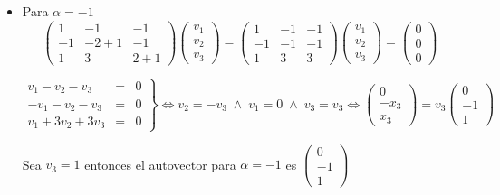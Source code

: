 \begin{enumerate}
\begin{itemize}
	\item Para $\alpha=-1$
	    $$
	    \begin{pmatrix}
		1 & -1 & -1 \\
		-1 & -2+1 & -1 \\
		1 & 3 & 2+1
	    \end{pmatrix}  
	    \begin{pmatrix}
		v_1 \\
		v_2 \\
		v_3
	    \end{pmatrix} = 
	    \begin{pmatrix}
		1 & -1 & -1 \\
		-1 & -1 & -1 \\
		1 & 3 & 3 
	    \end{pmatrix}  
	    \begin{pmatrix}
		v_1 \\
		v_2 \\
		v_3
	    \end{pmatrix} = 
	    \begin{pmatrix}
		0 \\
		0 \\
		0	
	    \end{pmatrix} 
	    $$

	    $$\left.\begin{array}{rcl}
		     v_1 -v_2 -v_3&=&0\\
			    -v_1-v_2-v_3&=&0\\
			    v_1+3v_2+3v_3&=&0
		\end{array}\right\} \Longleftrightarrow v_2=-v_3 \; \land \; v_1=0 \;\land \; v_3=v_3  \Longleftrightarrow  
		\begin{pmatrix}
		    0 \\
		    -x_3 \\
		    x_3
		\end{pmatrix}=v_3
		\begin{pmatrix}
		    0 \\
		    -1 \\
		    1 
		\end{pmatrix}
		$$

		Sea $v_3=1$ entonces el autovector para $\alpha=-1$ es
		$\begin{pmatrix}
		    0 \\
		    -1 \\
		    1 
		\end{pmatrix}$\\\\
	
    \end{itemize}


\end{enumerate}
